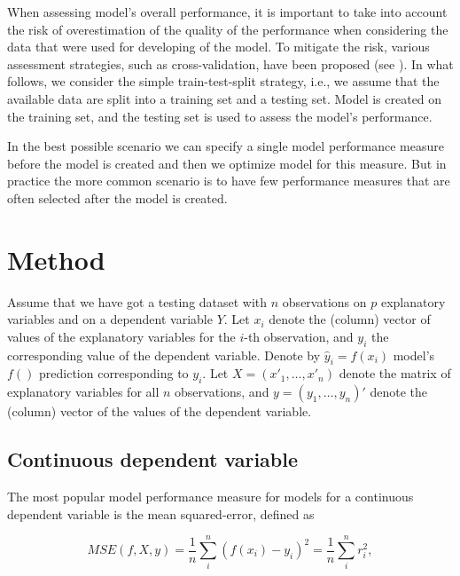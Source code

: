 \documentclass[]{krantz}
\begin{document}
When assessing model's overall performance, it is important to take into account the risk of overestimation of the quality of the performance when considering the data that were used for developing of the model. To mitigate the risk, various assessment strategies, such as cross-validation, have been proposed (see \citep{AppliedPredictiveModeling2013}). In what follows, we consider the simple train-test-split strategy, i.e., we assume that the available data are split into a training set and a testing set. Model is created on the training set, and the testing set is used to assess the model's performance.

In the best possible scenario we can specify a single model performance measure before the model is created and then we optimize model for this measure. But in practice the more common scenario is to have few performance measures that are often selected after the model is created.

\hypertarget{modelPerformanceMethod}{%
\section{Method}\label{modelPerformanceMethod}}

Assume that we have got a testing dataset with \(n\) observations on \(p\) explanatory variables and on a dependent variable \(Y\). Let \(x_i\) denote the (column) vector of values of the explanatory variables for the \(i\)-th observation, and \(y_i\) the corresponding value of the dependent variable. Denote by \(\widehat{y}_i=f(x_i)\) model's \(f()\) prediction corresponding to \(y_i\). Let \(X=(x'_1,\ldots,x'_n)\) denote the matrix of explanatory variables for all \(n\) observations, and \(y=(y_1,\ldots,y_n)'\) denote the (column) vector of the values of the dependent variable.

\hypertarget{modelPerformanceMethodCont}{%
\subsection{Continuous dependent variable}\label{modelPerformanceMethodCont}}

The most popular model performance measure for models for a continuous dependent variable is the mean squared-error, defined as

\begin{equation}
MSE(f,X,y) = \frac{1}{n} \sum_{i}^{n} (f(x_i) - y_i)^2 = \frac{1}{n} \sum_{i}^{n} r_i^2,
\label{eq:MSE}
\end{equation}
\end{document}
